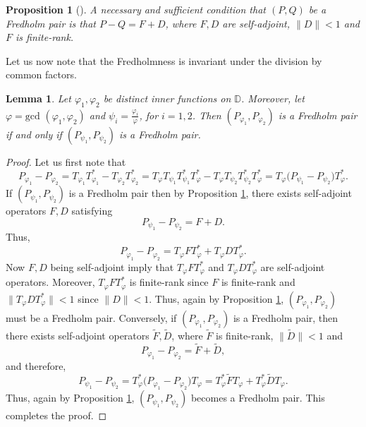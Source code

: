 \documentclass[12pt, a4 paper]{amsart}
\newcommand{\cll}{\mathcal{L}}
\newcommand{\D}{\mathbb{D}}
\theoremstyle{definition}
\theoremstyle{plain}
\newtheorem{lem}[thm]{Lemma}
\newtheorem{prop}[thm]{Proposition}
\theoremstyle{definition}
\numberwithin{equation}{section}
\let\phi=\varphi
\begin{document}
\begin{prop}[\cite{ASS}]\label{Fredholm}
A necessary and sufficient condition that $(P, Q)$ be a Fredholm pair is that $P - Q = F+D$, where $F, D$ are self-adjoint, $\|D\| < 1$ and $F$ is finite-rank.
\end{prop}
Let us now note that the Fredholmness is invariant under the division by common factors.
\begin{lem}\label{Fredholm_pair}
Let $\phi_1,\phi_2$ be distinct   inner functions on $\D$. Moreover, let $\phi=\mbox{gcd }(\phi_1,\phi_2)$ and $\psi_i = \frac{\phi_i}{\phi}$, for $i=1,2$. Then $(P_{\phi_1}, P_{\phi_2})$ is  a Fredholm pair if and only if $(P_{\psi_1}, P_{\psi_2})$ is a Fredholm pair.
\end{lem}
\begin{proof}
Let us first note that
\[
P_{\phi_1} - P_{\phi_2} = T_{\phi_1}T_{\phi_1}^* - T_{\phi_2}T_{\phi_2}^* = T_{\phi}T_{\psi_1} T_{\psi_1}^* T_{\phi}^* - T_{\phi}T_{\psi_2}T_{\psi_2}^*T_{\phi}^* = T_{\phi} \big( P_{\psi_1} - P_{\psi_2}  \big) T_{\phi}^*.
\]
If $(P_{\psi_1}, P_{\psi_2})$ is a Fredholm pair then by Proposition \ref{Fredholm}, there exists self-adjoint operators $F, D$ satisfying
\[
P_{\psi_1} - P_{\psi_2} = F + D.
\]
Thus,
\[
P_{\phi_1} - P_{\phi_2} =  T_{\phi} FT_{\phi}^* + T_{\phi}DT_{\phi}^*.
\]
Now $F,D$ being self-adjoint imply that $T_{\phi} FT_{\phi}^*$ and $T_{\phi}DT_{\phi}^*$ are self-adjoint operators.  Moreover, $T_{\phi} FT_{\phi}^*$ is finite-rank since $F$ is finite-rank and $\|T_{\phi}DT_{\phi}^* \| < 1$ since $\|D\| < 1$. Thus, again by Proposition \ref{Fredholm}, $(P_{\phi_1}, P_{\phi_2})$ must be a Fredholm pair. Conversely, if $(P_{\phi_1}, P_{\phi_2})$ is a Fredholm pair, then there exists self-adjoint operators $\tilde{F}, \tilde{D}$, where $\tilde{F}$ is finite-rank, $\|\tilde{D}\| <1$ and
\[
P_{\phi_1} - P_{\phi_2} = \tilde{F} + \tilde{D},
\]
and therefore,
\[
P_{\psi_1} - P_{\psi_2} = T_{\phi}^* \big( P_{\phi_1} - P_{\phi_2} \big)T_{\phi} = T_{\phi}^* \tilde{F}T_{\phi}+ T_{\phi}^* \tilde{D}T_{\phi}.
\]
Thus, again by Proposition \ref{Fredholm}, $(P_{\psi_1}, P_{\psi_2})$ becomes a Fredholm pair. This completes the proof.
\end{proof}

\end{document}
